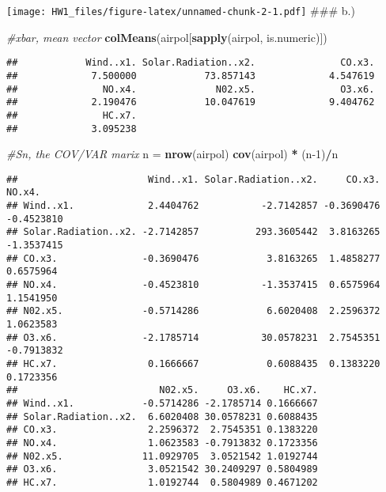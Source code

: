 \documentclass[
]{article}
\newenvironment{Shaded}{\begin{snugshade}}{\end{snugshade}}
\newcommand{\CommentTok}[1]{\textcolor[rgb]{0.56,0.35,0.01}{\textit{#1}}}
\newcommand{\DecValTok}[1]{\textcolor[rgb]{0.00,0.00,0.81}{#1}}
\newcommand{\KeywordTok}[1]{\textcolor[rgb]{0.13,0.29,0.53}{\textbf{#1}}}
\newcommand{\NormalTok}[1]{#1}
\newcommand{\OperatorTok}[1]{\textcolor[rgb]{0.81,0.36,0.00}{\textbf{#1}}}
\newcommand{\StringTok}[1]{\textcolor[rgb]{0.31,0.60,0.02}{#1}}
\begin{document}
\texttt{[image: HW1\_files/figure-latex/unnamed-chunk-2-1.pdf]} \#\#\#
b.)

\begin{Shaded}
\begin{Highlighting}[]
\CommentTok{#xbar, mean vector}
\KeywordTok{colMeans}\NormalTok{(airpol[}\KeywordTok{sapply}\NormalTok{(airpol, is.numeric)]) }
\end{Highlighting}
\end{Shaded}

\begin{verbatim}
##            Wind..x1. Solar.Radiation..x2.               CO.x3. 
##             7.500000            73.857143             4.547619 
##               NO.x4.              N02.x5.               O3.x6. 
##             2.190476            10.047619             9.404762 
##               HC.x7. 
##             3.095238
\end{verbatim}

\begin{Shaded}
\begin{Highlighting}[]
\CommentTok{#Sn, the COV/VAR marix}
\NormalTok{n =}\StringTok{ }\KeywordTok{nrow}\NormalTok{(airpol)}
\KeywordTok{cov}\NormalTok{(airpol) }\OperatorTok{*}\StringTok{ }\NormalTok{(n}\DecValTok{-1}\NormalTok{)}\OperatorTok{/}\NormalTok{n}
\end{Highlighting}
\end{Shaded}

\begin{verbatim}
##                       Wind..x1. Solar.Radiation..x2.     CO.x3.     NO.x4.
## Wind..x1.             2.4404762           -2.7142857 -0.3690476 -0.4523810
## Solar.Radiation..x2. -2.7142857          293.3605442  3.8163265 -1.3537415
## CO.x3.               -0.3690476            3.8163265  1.4858277  0.6575964
## NO.x4.               -0.4523810           -1.3537415  0.6575964  1.1541950
## N02.x5.              -0.5714286            6.6020408  2.2596372  1.0623583
## O3.x6.               -2.1785714           30.0578231  2.7545351 -0.7913832
## HC.x7.                0.1666667            0.6088435  0.1383220  0.1723356
##                         N02.x5.     O3.x6.    HC.x7.
## Wind..x1.            -0.5714286 -2.1785714 0.1666667
## Solar.Radiation..x2.  6.6020408 30.0578231 0.6088435
## CO.x3.                2.2596372  2.7545351 0.1383220
## NO.x4.                1.0623583 -0.7913832 0.1723356
## N02.x5.              11.0929705  3.0521542 1.0192744
## O3.x6.                3.0521542 30.2409297 0.5804989
## HC.x7.                1.0192744  0.5804989 0.4671202
\end{verbatim}
\end{document}
